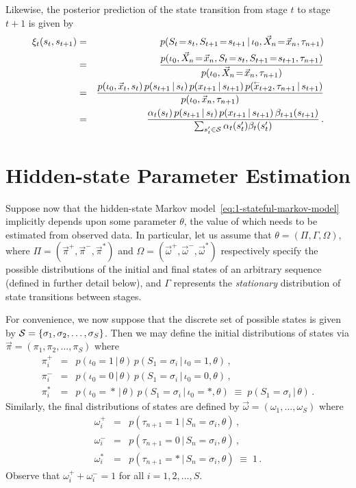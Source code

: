 \documentclass[a4paper]{article}
\newcommand{\rvec}[1]{\accentset{\leftarrow}{#1}}
\begin{document}
Likewise, the posterior prediction of the state transition from stage $t$ to stage $t+1$ is given by
\begin{eqnarray}
\xi_t(s_t,s_{t+1}) & = &
   p(S_t\!=\!s_t,S_{t+1}\!=\!s_{t+1}\,|\,\iota_0,\vec{X}_n\!=\!\vec{x}_n,\tau_{n+1})
\nonumber\\& = & 
\frac{p(\iota_0,\vec{X}_n\!=\!\vec{x}_n,S_t\!=\!s_t,S_{t+1}\!=\!s_{t+1},\tau_{n+1})}
        {p(\iota_0,\vec{X}_n\!=\!\vec{x}_n,\tau_{n+1})}
\nonumber\\& = & 
\frac{p(\iota_0,\vec{x}_t,s_t)\,p(s_{t+1}\,|\,s_t)\,p(x_{t+1}\,|\,s_{t+1})\,p(\rvec{x}_{t+2},\tau_{n+1}\,|\,s_{t+1})}
        {p(\iota_0,\vec{x}_n,\tau_{n+1})}
\nonumber\\& = & 
\frac{\alpha_t(s_t)\,p(s_{t+1}\,|\,s_t)\,p(x_{t+1}\,|\,s_{t+1})\,\beta_{t+1}(s_{t+1})}
        {\sum_{s_t'\in{\cal S}}\alpha_t(s_t')\beta_t(s_t')}
\,.
\end{eqnarray}

\section{Hidden-state Parameter Estimation}

Suppose now that the hidden-state Markov model~\eqref{eq:1-stateful-markov-model} implicitly depends upon some
parameter $\theta$, the value of which needs to be estimated from observed data.
In particular, let us assume that $\theta=(\Pi,\Gamma,\Omega)$,
where $\Pi=(\vec{\pi}^+,\vec{\pi}^-,\vec{\pi}^*)$ 
and $\Omega=(\vec{\omega}^+,\vec{\omega}^-,\vec{\omega}^*)$ respectively
specify the possible distributions of the initial and final
states of an arbitrary sequence (defined in further detail below),
and $\Gamma$ represents the {\em stationary} distribution of state transitions between stages.

For convenience, we now suppose that the discrete set of possible states is given by
${\cal S}=\{\sigma_1,\sigma_2,\ldots,\sigma_S\}$.
Then we may define the initial distributions of states via $\vec{\pi}=(\pi_{1},\pi_{2},\ldots,\pi_{S})$ where
\begin{eqnarray}
  \pi_{i}^+ & = & p(\iota_0\!=\!1\,|\,\theta)\,p(S_1\!=\!\sigma_i\,|\,\iota_0\!=\!1,\theta)\,,
\\
  \pi_{i}^- & = & p(\iota_0\!=\!0\,|\,\theta)\,p(S_1\!=\!\sigma_i\,|\,\iota_0\!=\!0,\theta)\,,
\\
  \pi_{i}^* & = & p(\iota_0\!=\!*\,|\,\theta)\,p(S_1\!=\!\sigma_i\,|\,\iota_0\!=\!*,\theta)\;\equiv\;p(S_1\!=\!\sigma_i\,|\,\theta)\,.
\end{eqnarray}
Similarly, the final distributions of states are defined by $\vec{\omega}=(\omega_1,\ldots,\omega_S)$ where
\begin{eqnarray}
  \omega_{i}^+ & = & p(\tau_{n+1}=1\,|\,S_n\!=\!\sigma_i,\theta)\,,
\\
  \omega_{i}^- & = & p(\tau_{n+1}=0\,|\,S_n\!=\!\sigma_i,\theta)\,,
\\
  \omega_{i}^* & = & p(\tau_{n+1}=*\,|\,S_n\!=\!\sigma_i,\theta)\;\equiv\;1\,.
\end{eqnarray}
Observe that $\omega^+_i+\omega^-_i=1$ for all $i=1,2,\ldots,S$.
\end{document}

